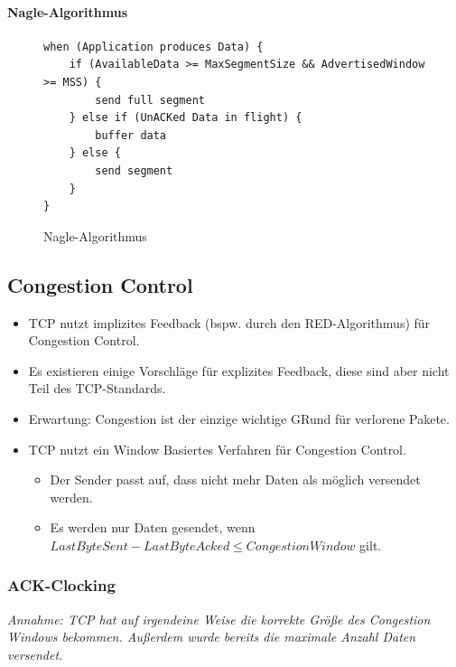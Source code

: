 \documentclass[a4paper, 11pt, accentcolor = tud3b]{tudreport}
\begin{document}
	                \paragraph{Nagle-Algorithmus}
		                \begin{figure}[H]
		                	\centering
		                	\begin{lstlisting}
when (Application produces Data) {
	if (AvailableData >= MaxSegmentSize && AdvertisedWindow >= MSS) {
		send full segment
	} else if (UnACKed Data in flight) {
		buffer data
	} else {
		send segment
	}
}
		                	\end{lstlisting}
		                	\caption{Nagle-Algorithmus}
		                \end{figure}

            \subsection{Congestion Control}
	            \label{sec:tcp_congestion_control}
            
                \begin{itemize}
                	\item TCP nutzt implizites Feedback (bspw. durch den RED-Algorithmus) für Congestion Control.
                	\item Es existieren einige Vorschläge für explizites Feedback, diese sind aber nicht Teil des TCP-Standards.
                	\item Erwartung: Congestion ist der einzige wichtige GRund für verlorene Pakete.
                	\item TCP nutzt ein Window Basiertes Verfahren für Congestion Control.
	                	\begin{itemize}
	                		\item Der Sender passt auf, dass nicht mehr Daten als möglich versendet werden.
	                		\item Es werden nur Daten gesendet, wenn \( \textit{LastByteSent} - \textit{LastByteAcked} \leq \textit{CongestionWindow} \) gilt.
	                	\end{itemize}
                \end{itemize}

                \subsubsection{ACK-Clocking}
                    \textit{Annahme: TCP hat auf irgendeine Weise die korrekte Größe des Congestion Windows bekommen. Außerdem wurde bereits die maximale Anzahl Daten versendet.}
                    
\end{document}

